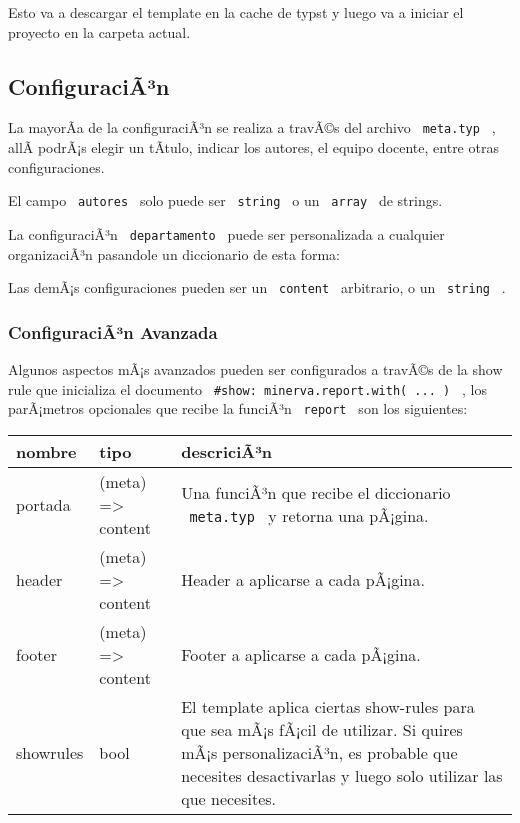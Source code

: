 Esto va a descargar el template en la cache de typst y luego va a
iniciar el proyecto en la carpeta actual.

\subsection{ConfiguraciÃ³n}\label{configuraciuxe3uxb3n}

La mayorÃ­a de la configuraciÃ³n se realiza a travÃ©s del archivo
\texttt{\ meta.typ\ } , allÃ­ podrÃ¡s elegir un tÃ­tulo, indicar los
autores, el equipo docente, entre otras configuraciones.

El campo \texttt{\ autores\ } solo puede ser \texttt{\ string\ } o un
\texttt{\ array\ } de strings.

La configuraciÃ³n \texttt{\ departamento\ } puede ser personalizada a
cualquier organizaciÃ³n pasandole un diccionario de esta forma:

\begin{Shaded}
\begin{Highlighting}[]
\NormalTok{  )}
\NormalTok{)}
\end{Highlighting}
\end{Shaded}

Las demÃ¡s configuraciones pueden ser un \texttt{\ content\ }
arbitrario, o un \texttt{\ string\ } .

\subsubsection{ConfiguraciÃ³n
Avanzada}\label{configuraciuxe3uxb3n-avanzada}

Algunos aspectos mÃ¡s avanzados pueden ser configurados a travÃ©s de la
show rule que inicializa el documento
\texttt{\ \#show:\ minerva.report.with(\ ...\ )\ } , los parÃ¡metros
opcionales que recibe la funciÃ³n \texttt{\ report\ } son los
siguientes:

\begin{longtable}[]{@{}lll@{}}
\toprule\noalign{}
nombre & tipo & descriciÃ³n \\
\midrule\noalign{}
\endhead
\bottomrule\noalign{}
\endlastfoot
portada & (meta) =\textgreater{} content & Una funciÃ³n que recibe el
diccionario \texttt{\ meta.typ\ } y retorna una pÃ¡gina. \\
header & (meta) =\textgreater{} content & Header a aplicarse a cada
pÃ¡gina. \\
footer & (meta) =\textgreater{} content & Footer a aplicarse a cada
pÃ¡gina. \\
showrules & bool & El template aplica ciertas show-rules para que sea
mÃ¡s fÃ¡cil de utilizar. Si quires mÃ¡s personalizaciÃ³n, es probable
que necesites desactivarlas y luego solo utilizar las que necesites. \\
\end{longtable}

